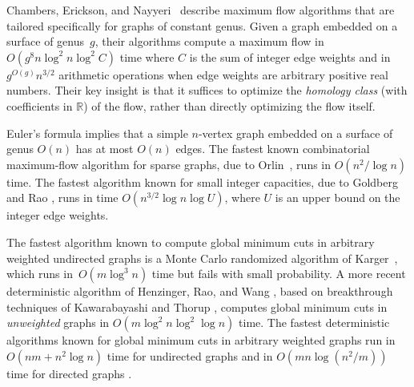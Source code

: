 \documentclass[11pt,twoside]{article}
\def\Real{\mathbb{R}}
\begin{document}
Chambers, Erickson, and Nayyeri~\cite{cen-hfcc-12} describe maximum flow algorithms that are tailored specifically for graphs of constant genus.
Given a graph embedded on a surface of genus~$g$, their algorithms compute a maximum flow in  $O(g^8 n \log^2 n \log^2 C)$ time where $C$ is the sum of integer edge weights and in $g^{O(g)}n^{3/2}$ arithmetic operations when edge weights are arbitrary positive real numbers.  Their key insight is that it suffices to optimize the \emph{homology class} (with coefficients in $\Real$) of the flow, rather than directly optimizing the flow itself.

Euler's formula implies that a simple $n$-vertex graph embedded on a surface of genus $O(n)$ has at most $O(n)$ edges.
The fastest known combinatorial maximum-flow algorithm for sparse graphs, due to Orlin~\cite{o-mfotl-13}, runs in $O(n^2 / \log n)$ time.
The fastest algorithm known for small integer capacities, due to Goldberg and Rao \cite{gr-bfdb-98}, runs in time $O(n^{3/2}\log n\log U)$, where $U$ is an upper bound on the integer edge weights.

The fastest algorithm known to compute global minimum cuts in arbitrary weighted undirected graphs is a Monte Carlo randomized algorithm of Karger~\cite{k-mcnlt-00}, which runs in~$O(m \log^3 n)$ time but fails with small probability. 
A more recent deterministic algorithm of Henzinger, Rao, and Wang \cite{hrw-lfpfe-17}, based on breakthrough techniques of Kawarabayashi and Thorup \cite{kt-dgmcs-15,kt-decnt-18}, computes global minimum cuts in \emph{unweighted} graphs in $O(m \log^2 n \log^2 \log n)$ time.
The fastest deterministic algorithms known for global minimum cuts in arbitrary weighted graphs run in $O(nm + n^2\log n)$ time for undirected graphs \cite{ni-cemcg-92,f-eani-94,sw-sma-97} and in $O(mn \log(n^2/m))$ time for directed graphs \cite{ho-fafmd-94}.
\end{document}
